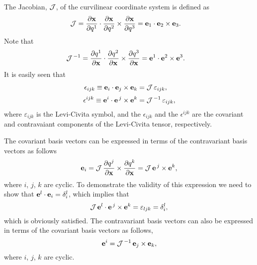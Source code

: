 \documentclass[12pt,prb,aps,notitlepage]{revtex4-1}
\begin{document}
The Jacobian, ${\cal J}$,  of the curvilinear coordinate system is defined as
\begin{align}\label{e4}
{\cal J} &= \frac{\partial{\bf x}}{\partial q^1}\cdot\frac{\partial {\bf x}}{\partial q^2}\times\frac{\partial{\bf x}}{\partial q^3}={\bf e}_1\cdot{\bf e}_2\times{\bf e}_3.
\end{align}
Note that
\begin{align}
{\cal J}^{\,-1} &= \frac{\partial q^1}{\partial {\bf x}}\cdot\frac{\partial q^2}{\partial{\bf x}}\times\frac{\partial q^3}{\partial{\bf x}}= {\bf e}^1\cdot{\bf e}^2\times{\bf e}^3.
\end{align}
It is easily seen that
\begin{align}
\epsilon_{ijk}\equiv {\bf e}_i\cdot{\bf e}_j\times{\bf e}_k&= {\cal J}\,\varepsilon_{ijk},\label{edown}\\[0.5ex]
\epsilon^{ijk}\equiv {\bf e}^i\cdot{\bf e}^{\,j}\times{\bf e}^k&= {\cal J}^{\,-1}\,\varepsilon_{ijk},\label{eup}
\end{align}
where $\varepsilon_{ijk}$ is the Levi-Civita symbol, and the $\epsilon_{ijk}$  and the $\epsilon^{ijk}$ are the covariant and
contravaiant components of the  Levi-Civita tensor, respectively. 

The covariant basis vectors can be expressed in terms of the contravariant basis vectors as follows
\begin{equation}\label{e5}
{\bf e}_i = {\cal J}\,\frac{\partial q^j}{\partial {\bf x}}\times \frac{\partial{q^k}}{\partial{\bf x}}= {\cal J}\,{\bf e}^{\,j}\times{\bf e}^k,
\end{equation}
where $i$, $j$, $k$ are cyclic. To demonstrate the validity of this expression we need to show that ${\bf e}^l\cdot{\bf e}_i= \delta_i^l$, 
which implies that 
\begin{equation}
 {\cal J}\,{\bf e}^l\cdot{\bf e}^{\,j}\times {\bf e}^k= \varepsilon_{ljk}=\delta_i^l,
 \end{equation}
 which is obviously satisfied. The contravariant basis vectors can also be expressed in terms of the covariant basis vectors as follows, 
 \begin{equation}
 {\bf e}^i = {\cal J}^{\,-1}\,{\bf e}_j\times{\bf e}_k,
 \end{equation}
 where $i$, $j$, $k$ are cyclic. 
 
\end{document}
